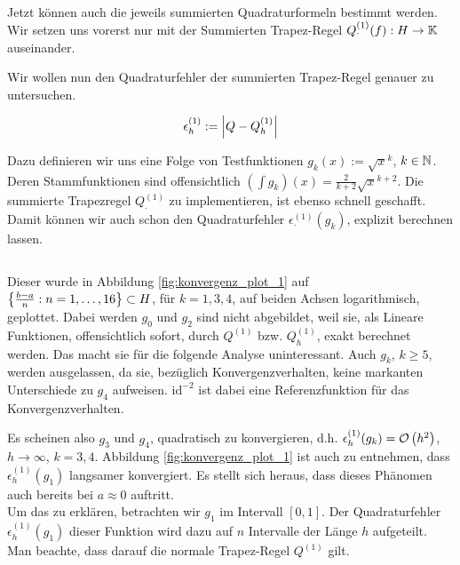 Jetzt können auch die jeweils summierten Quadraturformeln bestimmt werden. Wir setzen uns vorerst nur mit der Summierten Trapez-Regel $Q_\cdot^{(1)}(f): H \to \mathbb{K}$ auseinander.



Wir wollen nun den Quadraturfehler der summierten Trapez-Regel genauer zu untersuchen.

\begin{align*}
    \epsilon_h^{(1)} := \left | Q - Q_h^{(1)} \right |
\end{align*}

Dazu definieren wir uns eine Folge von Testfunktionen $g_k(x) := \sqrt{x}^k$, $k \in \mathbb{N}$. Deren Stammfunktionen sind offensichtlich $(\int g_k)(x) = \frac{2}{k+2} \sqrt{x}^{k+2}$. Die summierte Trapezregel $Q_\cdot^{(1)}$ zu implementieren, ist ebenso schnell geschafft. Damit können wir auch schon den Quadraturfehler $\epsilon^{(1)}_\cdot(g_k)$, explizit berechnen lassen. \\

\inputminted{python}{Aufgabe_2/python_code/summierte_trapez_regel.py}

Dieser wurde in Abbildung \ref{fig:konvergenz_plot_1} auf $\left \{ \frac{b-a}{n}: n = 1, \ldots, 16 \right \} \subset H$, für $k = 1, 3, 4$, auf beiden Achsen logarithmisch, geplottet. Dabei werden $g_0$ und $g_2$ sind nicht abgebildet, weil sie, als Lineare Funktionen, offensichtlich sofort, durch $Q^{(1)}$ bzw. $Q_h^{(1)}$, exakt berechnet werden. Das macht sie für die folgende Analyse uninteressant. Auch $g_k$, $k \geq 5$, werden ausgelassen, da sie, bezüglich Konvergenzverhalten, keine markanten Unterschiede zu $g_4$ aufweisen. $\text{id}^{-2}$ ist dabei eine Referenzfunktion für das Konvergenzverhalten.



Es scheinen also $g_3$ und $g_4$, quadratisch zu konvergieren, d.h. $\epsilon_h^{(1)}(g_k) = \mathcal{O} \left ( h^2 \right )$, $h \to \infty$, $k = 3, 4$. Abbildung \ref{fig:konvergenz_plot_1} ist auch zu entnehmen, dass $\epsilon_h^{(1)}(g_1)$ langsamer konvergiert. Es stellt sich heraus, dass dieses Phänomen auch bereits bei $a \approx 0$ auftritt. \\

Um das zu erklären, betrachten wir $g_1$ im Intervall $[0, 1]$. Der Quadraturfehler $\epsilon_h^{(1)}(g_1)$ dieser Funktion wird dazu auf $n$ Intervalle der Länge $h$ aufgeteilt. Man beachte, dass darauf die normale Trapez-Regel $Q^{(1)}$ gilt. \\

